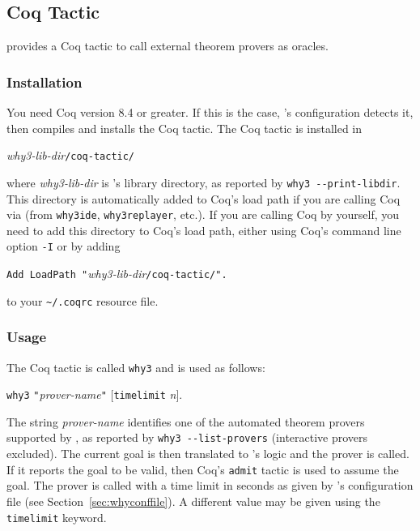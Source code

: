 \subsection{Coq Tactic}
\label{sec:coqtactic}

\why provides a Coq tactic to call external theorem provers as oracles.

\subsubsection{Installation}

You need Coq version 8.4 or greater. If this is the case, \why's
configuration detects it, then compiles and installs the Coq tactic.
The Coq tactic is installed in
\begin{center}
  \textit{why3-lib-dir}\texttt{/coq-tactic/}
\end{center}
where \textit{why3-lib-dir} is \why's library directory, as reported
by \verb+why3 --print-libdir+. This directory
is automatically added to Coq's load path if you are
calling Coq via \why (from \texttt{why3ide}, \texttt{why3replayer},
etc.). If you are calling Coq by yourself, you need to add
this directory to Coq's load path, either using Coq's command line
option \texttt{-I} or by adding
\begin{center}
  \verb+Add LoadPath "+\textit{why3-lib-dir}\verb+/coq-tactic/".+
\end{center}
to your \texttt{\~{}/.coqrc} resource file.

\subsubsection{Usage}

The Coq tactic is called \texttt{why3} and is used as follows:
\begin{center}
  \texttt{why3} \verb+"+\textit{prover-name}\verb+"+
  $[$\texttt{timelimit} \textit{n}$]$.
\end{center}
The string \textit{prover-name} identifies one of the automated theorem provers
supported by \why, as reported by \verb+why3 --list-provers+
(interactive provers excluded).
The current goal is then translated to \why's logic and the prover is
called. If it reports the goal to be valid, then Coq's \texttt{admit}
tactic is used to assume the goal. The prover is called with a time
limit in seconds as given by \why's configuration file
(see Section~\ref{sec:whyconffile}). A different value may be given
using the \texttt{timelimit} keyword.


